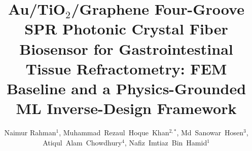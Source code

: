 \documentclass[5p,times,twocolumn]{elsarticle}
\begin{document}
\begin{frontmatter}

\title{Au/TiO$_2$/Graphene Four-Groove SPR Photonic Crystal Fiber Biosensor for Gastrointestinal Tissue Refractometry: FEM Baseline and a Physics-Grounded ML Inverse-Design Framework}

\author[]{ {
Naimur Rahman$^{1}$,
Muhammad~Rezaul~Hoque~Khan$^{2,*}$,
Md~Sanowar~Hosen$^{3}$,
Atiqul~Alam~Chowdhury$^{4}$,
Nafiz~Imtiaz~Bin~Hamid$^{1}$
}
}

\address{\bf {1.~Department of Electrical \& Electronic Engineering, Islamic University of Technology, Gazipur-1704, Bangladesh.\\
2.~Department of Electrical \& Electronic Engineering, Atish Dipankar University of Science \& Technology, Dhaka, Bangladesh.\\
3.~Department of Electrical \& Electronics Engineering, Daffodil International University, Daffodil Smart City, Dhaka, Bangladesh.\\
4.~Department of Electrical \& Electronic Engineering, Southeast University, Dhaka, Bangladesh.}}



\end{frontmatter}
\end{document}
